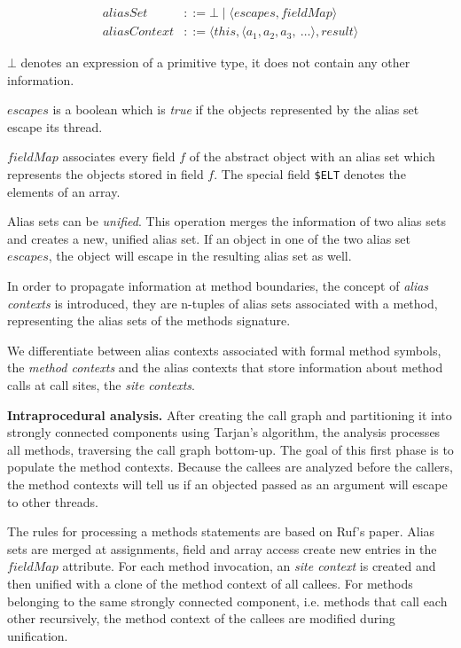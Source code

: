 \documentclass[letterpaper]{article}
\newcommand{\mypar}[1]{{\bf #1.}}
\begin{document}
\begin{equation*}
\begin{split}
    aliasSet &::= \bot \mid \langle escapes, fieldMap \rangle \\
    aliasContext &::= \langle this, \langle a_{1}, a_{2}, a_{3},~\dots \rangle, result \rangle
\end{split}
\end{equation*}

$\bot$ denotes an expression of a primitive type, it does not contain any other information.

$escapes$ is a boolean which is \emph{true} if the objects represented by the alias set escape its thread.

$fieldMap$ associates every field $f$ of the abstract object with an alias set which represents the objects stored in field $f$.
The special field \texttt{\$ELT} denotes the elements of an array.

Alias sets can be \emph{unified}. This operation merges the information of two alias sets and creates a new, unified alias set.
If an object in one of the two alias set $escapes$, the object will escape in the resulting alias set as well.

In order to propagate information at method boundaries, the concept of \emph{alias contexts} is introduced, they
are n-tuples of alias sets associated with a method, representing the alias sets of the methods signature.

We differentiate between alias contexts associated with formal method symbols, the \emph{method contexts} and the
alias contexts that store information about method calls at call sites, the \emph{site contexts}.

\mypar{Intraprocedural analysis} After creating the call graph and partitioning it 
into strongly connected components using Tarjan's algorithm, the analysis processes all methods,
traversing the call graph bottom-up. The goal of this first phase is to populate the
method contexts. Because the callees are analyzed before the callers, the method
contexts will tell us if an objected passed as an argument will escape to other threads.

The rules for processing a methods statements are based on Ruf's \cite{Ruf:00} paper. Alias sets are merged
at assignments, field and array access create new entries in the $fieldMap$ attribute. 
For each method invocation, an \emph{site context} is created and then unified with
a clone of the method context of all callees. For methods belonging to the same strongly connected component, i.e.
methods that call each other recursively, the method context of the callees are modified during unification.
\end{document}

